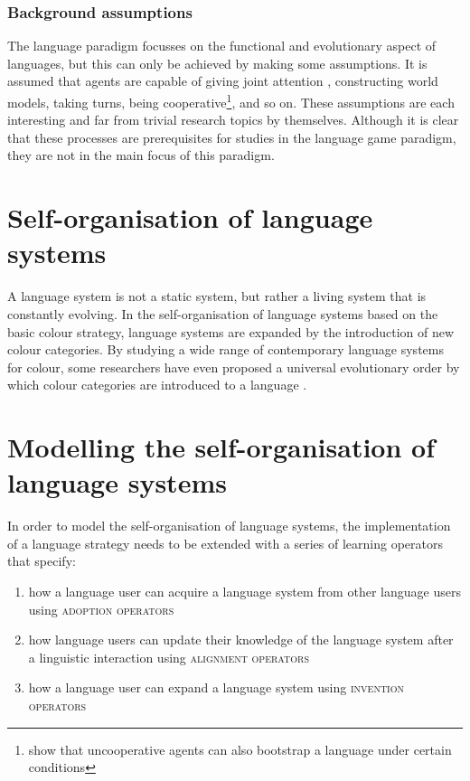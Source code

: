 \subsubsection{Background assumptions}

The language paradigm focusses on the functional and evolutionary
aspect of languages, but this can only be achieved by making some
assumptions. It is assumed that agents are capable of giving joint
attention \citep{tomasello95jointattention}, constructing world
models, taking turns, being cooperative\footnote{\cite{wang08self}
  show that uncooperative agents can also bootstrap a language under
  certain conditions}, and so on. These assumptions are each
interesting and far from trivial research topics by
themselves. Although it is clear that these processes are
prerequisites for studies in the language game paradigm, they are not
in the main focus of this paradigm.

\section{Self-organisation of language systems}

A language system is not a static system, but rather a living system
that is constantly evolving. In the self-organisation of language systems
based on the basic colour strategy, language systems are expanded by
the introduction of new colour categories. By studying a wide range of
contemporary language systems for colour, some researchers have even
proposed a universal evolutionary order by which colour categories are
introduced to a language \citep{berlin69basic}.


\section{Modelling the self-organisation of language systems}

In order to model the self-organisation of language systems, 
the implementation of a language strategy needs
to be extended with a series of learning operators that specify:

\begin{enumerate}
\item how a language user can acquire a language system from other
  language users using \textsc{adoption operators}
\item how language users can update their knowledge of the language
  system after a linguistic interaction using \textsc{alignment
    operators}
\item how a language user can expand a language system using
  \textsc{invention operators}
\end{enumerate}

